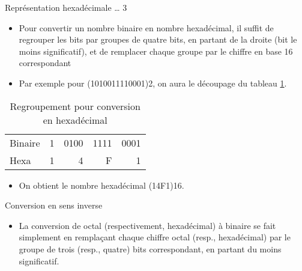 \documentclass[presentation]{beamer}
\begin{document}
\begin{frame}[label={sec:org666ae3f}]{Représentation hexadécimale \ldots{} 3}
\begin{itemize}
\item Pour convertir un nombre binaire en nombre hexadécimal, il suffit de regrouper les bits par groupes de quatre bits, en partant de la droite (bit le moins significatif), et de remplacer chaque groupe par le chiffre en base 16 correspondant

\item Par exemple pour (1010011110001)2, on aura le découpage du tableau \ref{tab:org5ce7a0f}.
\end{itemize}

\begin{table}[htbp]
\caption{\label{tab:org5ce7a0f}Regroupement pour conversion en hexadécimal}
\centering
\begin{tabular}{lrrrr}
 &  &  &  & \\
\hline
Binaire & 1 & 0100 & 1111 & 0001\\
Hexa & 1 & 4 & F & 1\\
\end{tabular}
\end{table}

\begin{itemize}
\item On obtient le nombre hexadécimal (14F1)16.
\end{itemize}
\end{frame}

\begin{frame}[label={sec:orgcd1d46e}]{Conversion en sens inverse}
\begin{itemize}
\item La conversion de octal (respectivement, hexadécimal) à binaire se fait simplement en remplaçant chaque chiffre octal (resp., hexadécimal) par le groupe de trois (resp., quatre) bits correspondant, en partant du moins significatif.
\end{itemize}
\end{frame}
\end{document}
